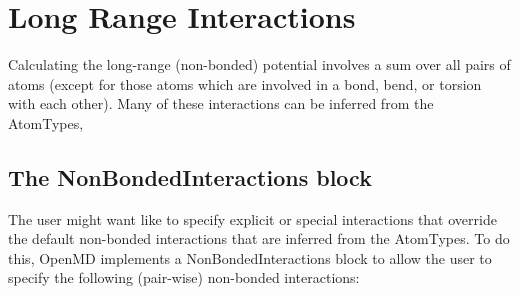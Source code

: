 \documentclass[]{book}
\begin{document}
\section{\label{section::ffLongRange}Long Range Interactions}

Calculating the long-range (non-bonded) potential involves a sum over
all pairs of atoms (except for those atoms which are involved in a
bond, bend, or torsion with each other).  Many of these interactions
can be inferred from the AtomTypes,

\subsection{\label{section:ffNBinteraction}The NonBondedInteractions
  block}

The user might want like to specify explicit or special interactions
that override the default non-bonded interactions that are inferred
from the AtomTypes.  To do this, OpenMD implements a
NonBondedInteractions block to allow the user to specify the following
(pair-wise) non-bonded interactions:
\end{document}
